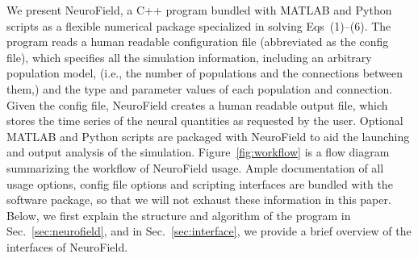 \documentclass[preprint,review,10pt,authoryear,letterpaper]{elsarticle}
\begin{document}
We present NeuroField, a C++ program bundled with MATLAB and Python scripts as a flexible numerical package specialized in solving Eqs~(1)--(6). The program reads a human readable configuration file (abbreviated as the config file), which specifies all the simulation information, including an arbitrary population model, (i.e., the number of populations and the connections between them,) and the type and parameter values of each population and connection. Given the config file, NeuroField creates a human readable output file, which stores the time series of the neural quantities as requested by the user. Optional MATLAB and Python scripts are packaged with NeuroField to aid the launching and output analysis of the simulation. Figure~\ref{fig:workflow} is a flow diagram summarizing the workflow of NeuroField usage. Ample documentation of all usage options, config file options and scripting interfaces are bundled with the software package, so that we will not exhaust these information in this paper. Below, we first explain the structure and algorithm of the program in Sec.~\ref{sec:neurofield}, and in Sec.~\ref{sec:interface}, we provide a brief overview of the interfaces of NeuroField.
\end{document}
